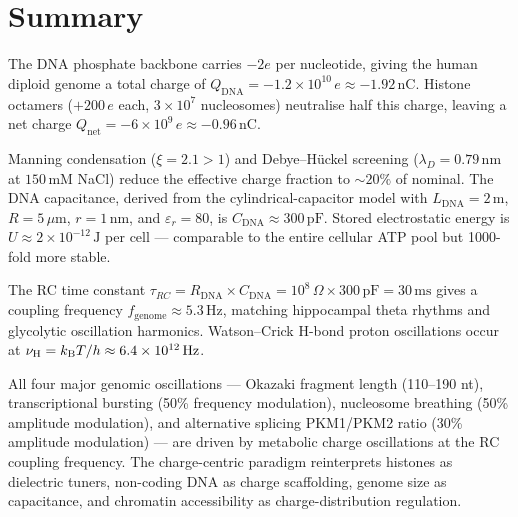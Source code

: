 \section{Summary}
\label{sec:ch15_summary}

\begin{chapterbox}
The DNA phosphate backbone carries $-2e$ per nucleotide, giving the human
diploid genome a total charge of $Q_{\mathrm{DNA}} = -1.2\times 10^{10}\,e
\approx -1.92\,\mathrm{nC}$. Histone octamers ($+200\,e$ each,
$3\times 10^7$ nucleosomes) neutralise half this charge, leaving a net
charge $Q_{\mathrm{net}} = -6\times 10^9\,e \approx -0.96\,\mathrm{nC}$.

Manning condensation ($\xi = 2.1 > 1$) and Debye--H\"uckel screening
($\lambda_D = 0.79\,\mathrm{nm}$ at $150\,\mathrm{mM}$ NaCl) reduce
the effective charge fraction to $\sim 20\%$ of nominal. The DNA
capacitance, derived from the cylindrical-capacitor model with
$L_{\mathrm{DNA}} = 2\,\mathrm{m}$, $R = 5\,\mu\mathrm{m}$,
$r = 1\,\mathrm{nm}$, and $\varepsilon_r = 80$, is
$C_{\mathrm{DNA}} \approx 300\,\mathrm{pF}$. Stored electrostatic
energy is $U \approx 2\times 10^{-12}\,\mathrm{J}$ per cell ---
comparable to the entire cellular ATP pool but 1000-fold more stable.

The RC time constant $\tau_{RC} = R_{\mathrm{DNA}} \times C_{\mathrm{DNA}}
= 10^8\,\Omega \times 300\,\mathrm{pF} = 30\,\mathrm{ms}$ gives a
coupling frequency $f_{\mathrm{genome}} \approx 5.3\,\mathrm{Hz}$,
matching hippocampal theta rhythms and glycolytic oscillation harmonics.
Watson--Crick H-bond proton oscillations occur at $\nu_{\mathrm{H}}
= k_{\mathrm{B}} T/h \approx 6.4\times 10^{12}\,\mathrm{Hz}$.

All four major genomic oscillations --- Okazaki fragment length
(110--190 nt), transcriptional bursting (50\% frequency modulation),
nucleosome breathing (50\% amplitude modulation), and alternative
splicing PKM1/PKM2 ratio (30\% amplitude modulation) --- are driven
by metabolic charge oscillations at the RC coupling frequency.
The charge-centric paradigm reinterprets histones as dielectric
tuners, non-coding DNA as charge scaffolding, genome size as
capacitance, and chromatin accessibility as charge-distribution
regulation.
\end{chapterbox}
